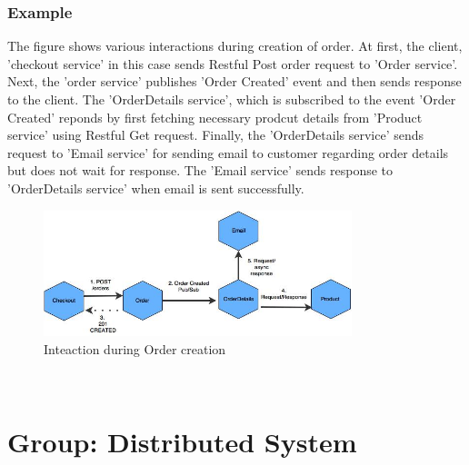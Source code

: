\subsubsection{Example}\label{section:challanges_of_microservices_architecture/integration/example}
The figure shows various interactions during creation of order. At first, the client, 'checkout service' in this case sends Restful Post order request to 'Order service'. Next, the 'order service' publishes 'Order Created' event and then sends response to the client. The 'OrderDetails service', which is subscribed to the event 'Order Created' reponds by first fetching necessary prodcut details from 'Product service' using Restful Get request. Finally, the 'OrderDetails service' sends request to 'Email service' for sending email to customer regarding order details but does not wait for response. The 'Email service' sends response to 'OrderDetails service' when email is sent successfully.
\begin{figure}[H]
\begin{center}
\includegraphics[width=0.8\textwidth]{figures/challanges_two_interaction_example}
\caption{Inteaction during Order creation}
\label{fig:challanges_of_microservices_architecture/integration/inter_service_communication/interaction_during_order_creation}
\end{center}
\end{figure}
\\

\section{Group: Distributed System}\label{section:challanges_of_microservices_architecture/distributed_system}
